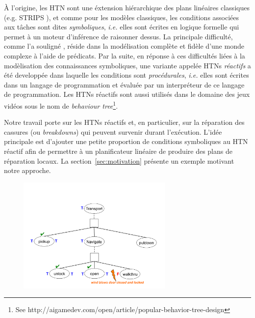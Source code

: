 \documentclass[a4paper,twoside,french]{article}
\begin{document}
		\par \`A l'origine, les HTN sont une \'extension hi\'erarchique des plans lin\'eaires classiques (e.g. STRIPS \cite{fikes1972strips}), et comme pour les modèles classiques, les conditions associ\'ees aux t\^aches sont dites \textit{symboliques}, \emph{i.e.} elles sont \'ecrites en logique formelle qui permet à un moteur d'inf\'erence de raisonner dessus. La principale difficulté, comme l'a souligné \cite{gil1992acquiring}, réside dans la modélisation complète et fidèle d'une monde complexe à l'aide de prédicats. Par la suite, en r\'eponse à ces difficult\'es li\'ees \`a la mod\`elisation des connaissances symboliques, une variante appel\'ee HTNs \textit{réactifs} a \'et\'e developp\'ee dans laquelle les conditions sont \textit{proc\'edurales}, \emph{i.e.} elles sont \'ecrites dans un langage de programmation et \'evalu\'ee par un interpr\'eteur de ce langage de programmation. Les HTNs réactifs sont aussi utilis\'es dans le domaine des jeux vid\'eos sous le nom de \emph{behaviour tree}\footnote{See http://aigamedev.com/open/article/popular-behavior-tree-design}.	
		\par Notre travail porte sur les HTNs réactifs et, en particulier, sur la réparation des cassures (ou \emph{breakdowns}) qui peuvent survenir durant l'exécution. L'idée principale est d'ajouter une petite proportion de conditions symboliques au HTN réactif afin de permettre à un planificateur linéaire de produire des plans de réparation locaux. La section~\ref{sec:motivation} présente un exemple motivant notre approche.
				\begin{figure}[t]
					\centerline{\includegraphics[width=3in]{figs/wind}}
					\vskip 8pt
				\end{figure}
\end{document}

